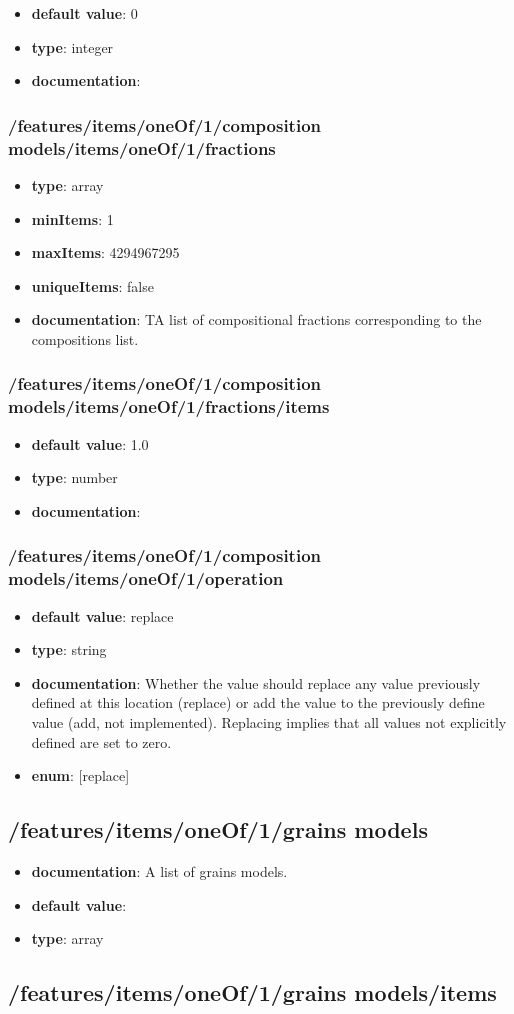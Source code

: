 \begin{itemize}\item {\bf default value}: 0
\item {\bf type}: integer
\item {\bf documentation}: 
\end{itemize}\subsubsection{/features/items/oneOf/1/composition models/items/oneOf/1/fractions}
\begin{itemize}\item {\bf type}: array
\item {\bf minItems}: 1
\item {\bf maxItems}: 4294967295
\item {\bf uniqueItems}: false
\item {\bf documentation}: TA list of compositional fractions corresponding to the compositions list.
\end{itemize}\subsubsection{/features/items/oneOf/1/composition models/items/oneOf/1/fractions/items}
\begin{itemize}\item {\bf default value}: 1.0
\item {\bf type}: number
\item {\bf documentation}: 
\end{itemize}\subsubsection{/features/items/oneOf/1/composition models/items/oneOf/1/operation}
\begin{itemize}\item {\bf default value}: replace
\item {\bf type}: string
\item {\bf documentation}: Whether the value should replace any value previously defined at this location (replace) or add the value to the previously define value (add, not implemented). Replacing implies that all values not explicitly defined are set to zero.
\item {\bf enum}: [replace]\end{itemize}\subsection{/features/items/oneOf/1/grains models}
\begin{itemize}\item {\bf documentation}: A list of grains models.
\item {\bf default value}: 
\item {\bf type}: array
\end{itemize}\subsection{/features/items/oneOf/1/grains models/items}


